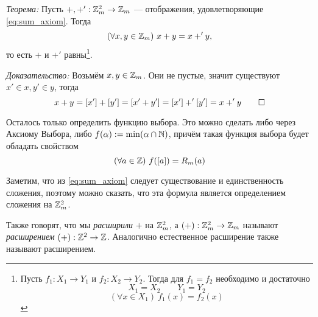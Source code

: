 \vspace{1em}
{\it Теорема:} Пусть $+,+':\mathbb Z_{m}^{2}\to\mathbb Z_{m}$ --- отображения,
удовлетворяющие \eqref{eq:sum_axiom}. Тогда
\[
  (\forall x,y\in\mathbb Z_{m})~x+y=x+'y,
\]
то есть $+$ и $+'$ равны\footnote{Пусть $f_1:X_1\to Y_1$ и $f_2:X_2\to Y_2$.
  Тогда для $f_1=f_2$ необходимо и достаточно
  \[
    X_1=X_2\qquad Y_1=Y_2
  \]
  \[
    (\forall x\in X_1)~f_1(x)=f_2(x)
  \]
}.

{\it Доказательство:} Возьмём $x,y\in\mathbb Z_{m}$. Они не пустые, значит
существуют $x'\in x,y'\in y$, тогда
\[
  x+y=[x']+[y']=[x'+y']=[x']+'[y']=x+'y\qed
\]

Осталось только определить функцию выбора. Это можно сделать либо через
Аксиому Выбора, либо $f(\alpha):=\min(\alpha\cap\mathbb N)$, причём такая функция
выбора будет обладать свойством
\[
  (\forall a\in\mathbb Z)~f([a])=R_{m}(a)
\]

Заметим, что из \eqref{eq:sum_axiom} следует существование
и единственность сложения, поэтому можно сказать, 
что эта формула является определением сложения на $\mathbb Z_{m}^{2}$.

Также говорят, что мы {\it расширили} $+$ на $\mathbb Z_{m}^{2}$,
а $(+):\mathbb Z_{m}^{2}\to\mathbb Z_{m}$ называют {\it расширением} $(+):\mathbb Z^{2}\to\mathbb Z$.
Аналогично естественное расширение также называют расширением.

